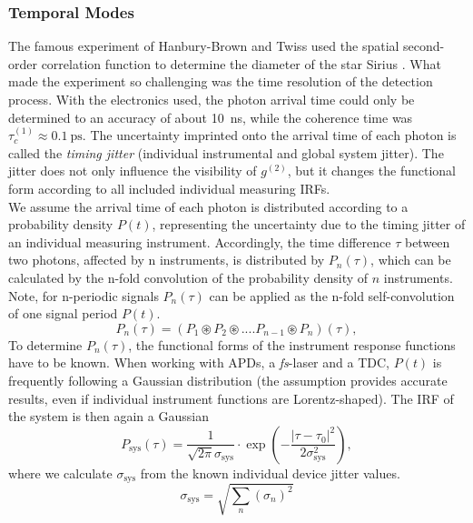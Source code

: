 \subsubsection{Temporal Modes}\label{sec:g2_temp_modes}
The famous experiment of Hanbury-Brown and Twiss used the spatial second-order correlation function to determine the diameter of the star Sirius \cite{hanbury_brown_test_1956}. What made the experiment so
challenging was the time resolution of the detection process. With the electronics used, the photon arrival time could only be determined to an accuracy of about \SI{10}{\ns}, while the
coherence time was $\tau_c^{(1)}\approx\SI{0.1}{\ps}$. The uncertainty imprinted onto the arrival time of each photon is called the \textit{timing jitter} (individual instrumental and global system jitter). The jitter does not only influence the visibility of $g^{(2)}$, but it changes the functional form according to all included individual measuring \ac{IRF}s.\\
We assume the arrival time of each photon is distributed according to a probability density $P(t)$, representing the uncertainty due to the timing jitter of an individual measuring instrument.
Accordingly, the time difference $\tau$ between two photons, affected by n instruments, is distributed by $P_n(\tau)$, which can be calculated by the n-fold convolution of the probability density of $n$ instruments. Note, for n-periodic signals $P_n(\tau)$ can be applied as the n-fold self-convolution of one signal period $P(t)$.
\begin{equation}\label{eq:tempmode1}
	P_n(\tau)=(P_1\circledast P_2\circledast....P_{n-1}\circledast P_n)(\tau),
\end{equation}
To determine $P_n(\tau)$, the functional forms of the instrument response functions have to be known. When
working with \ac{APD}s, a \textit{fs}-laser and a \ac{TDC}, $P(t)$ is frequently following a Gaussian distribution (the assumption provides accurate results, even if individual instrument functions are Lorentz-shaped).
The \ac{IRF} of the system is then again a Gaussian
\begin{equation}\label{eq:tempmode2}
	P_\mathrm{sys}(\tau)=\frac{1}{\sqrt{2\pi}\sigma_\mathrm{sys}}\cdot \exp{\left(-\dfrac{|\tau-\tau_0|^2}{2\sigma_\mathrm{sys}^2}\right)},
\end{equation}
where we calculate $\sigma_{\mathrm{sys}}$ from the known individual device jitter values.
\begin{equation}\label{eq:system_jitter}
	\sigma_{\mathrm{sys}}=\sqrt{\sum_{n} (\sigma_n)^2}
\end{equation}
